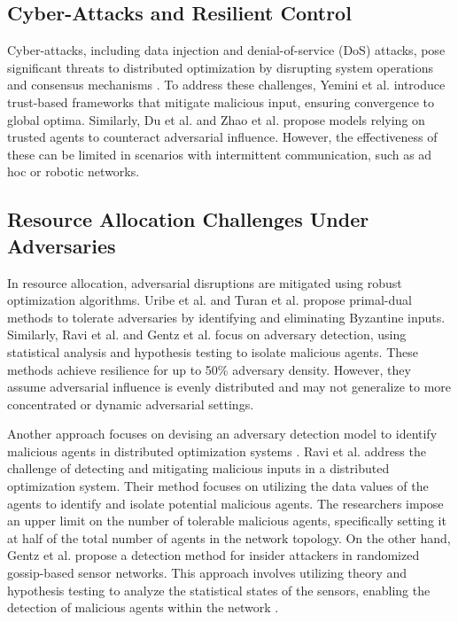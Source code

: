 \subsection{Cyber-Attacks and Resilient Control}
Cyber-attacks, including data injection and denial-of-service (DoS) attacks, pose significant threats to distributed optimization by disrupting system operations and consensus mechanisms \cite{ishii2022overview}. To address these challenges, Yemini et al. \cite{yemini2022resilience} introduce trust-based frameworks that mitigate malicious input, ensuring convergence to global optima. Similarly, Du et al. \cite{du2023distributed} and Zhao et al. \cite{zhao2019resilient} propose models relying on trusted agents to counteract adversarial influence. However, the effectiveness of these can be limited in scenarios with intermittent communication, such as ad hoc or robotic networks.

\subsection{Resource Allocation Challenges Under Adversaries}
In resource allocation, adversarial disruptions are mitigated using robust optimization algorithms. Uribe et al. \cite{uribe2019resilient} and Turan et al. \cite{turan2020resilient} propose primal-dual methods to tolerate adversaries by identifying and eliminating Byzantine inputs. Similarly, Ravi et al. \cite{ravi2019case} and Gentz et al. \cite{gentz2016data} focus on adversary detection, using statistical analysis and hypothesis testing to isolate malicious agents. These methods achieve resilience for up to 50\% adversary density. However, they assume adversarial influence is evenly distributed and may not generalize to more concentrated or dynamic adversarial settings.
 
Another approach focuses on devising an adversary detection model to identify malicious agents in distributed optimization systems \cite{ravi2019case, gentz2016data}. Ravi et al. \cite{ravi2019case} address the challenge of detecting and mitigating malicious inputs in a distributed optimization system. Their method focuses on utilizing the data values of the agents to identify and isolate potential malicious agents. The researchers impose an upper limit on the number of tolerable malicious agents, specifically setting it at half of the total number of agents in the network topology. On the other hand, Gentz et al. propose a detection method for insider attackers in randomized gossip-based sensor networks. This approach involves utilizing theory and hypothesis testing to analyze the statistical states of the sensors, enabling the detection of malicious agents within the network \cite{gentz2016data}.

